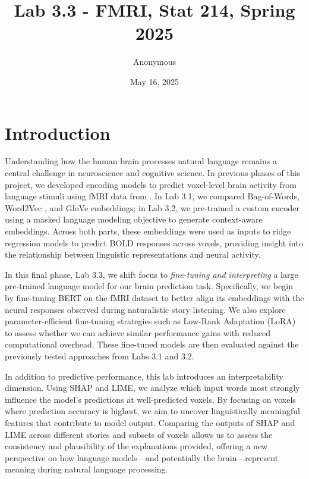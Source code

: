 \documentclass[10pt,letterpaper]{article}
\title{Lab 3.3 - FMRI, Stat 214, Spring 2025}
\author{Anonymous}
\date{May 16, 2025}
\begin{document}
\maketitle

\section{Introduction}

Understanding how the human brain processes natural language remains a central challenge in neuroscience and cognitive science. In previous phases of this project, we developed encoding models to predict voxel-level brain activity from language stimuli using fMRI data from \cite{jain2018incorporating}. In Lab 3.1, we compared Bag-of-Words, Word2Vec \cite{mikolov2013efficient}, and GloVe \cite{pennington2014glove} embeddings; in Lab 3.2, we pre-trained a custom encoder using a masked language modeling objective to generate context-aware embeddings. Across both parts, these embeddings were used as inputs to ridge regression models to predict BOLD responses across voxels, providing insight into the relationship between linguistic representations and neural activity.

In this final phase, Lab 3.3, we shift focus to \textit{fine-tuning and interpreting} a large pre-trained language model for our brain prediction task. Specifically, we begin by fine-tuning BERT \cite{devlin2019bert} on the fMRI dataset to better align its embeddings with the neural responses observed during naturalistic story listening. We also explore parameter-efficient fine-tuning strategies such as Low-Rank Adaptation (LoRA) to assess whether we can achieve similar performance gains with reduced computational overhead. These fine-tuned models are then evaluated against the previously tested approaches from Labs 3.1 and 3.2.

In addition to predictive performance, this lab introduces an interpretability dimension. Using SHAP and LIME, we analyze which input words most strongly influence the model’s predictions at well-predicted voxels. By focusing on voxels where prediction accuracy is highest, we aim to uncover linguistically meaningful features that contribute to model output. Comparing the outputs of SHAP and LIME across different stories and subsets of voxels allows us to assess the consistency and plausibility of the explanations provided, offering a new perspective on how language models—and potentially the brain—represent meaning during natural language processing.
\end{document}
